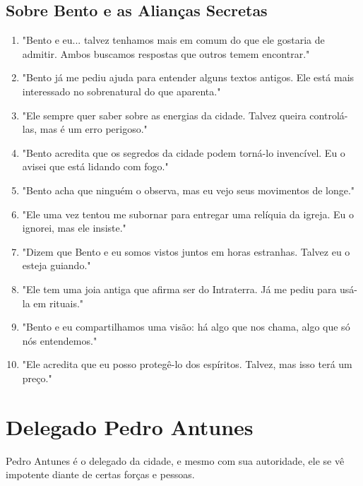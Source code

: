 \subsection*{Sobre Bento e as Alianças Secretas}
\begin{enumerate}
    \item "Bento e eu... talvez tenhamos mais em comum do que ele gostaria de admitir. Ambos buscamos respostas que outros temem encontrar."
    \item "Bento já me pediu ajuda para entender alguns textos antigos. Ele está mais interessado no sobrenatural do que aparenta."
    \item "Ele sempre quer saber sobre as energias da cidade. Talvez queira controlá-las, mas é um erro perigoso."
    \item "Bento acredita que os segredos da cidade podem torná-lo invencível. Eu o avisei que está lidando com fogo."
    \item "Bento acha que ninguém o observa, mas eu vejo seus movimentos de longe."
    \item "Ele uma vez tentou me subornar para entregar uma relíquia da igreja. Eu o ignorei, mas ele insiste."
    \item "Dizem que Bento e eu somos vistos juntos em horas estranhas. Talvez eu o esteja guiando."
    \item "Ele tem uma joia antiga que afirma ser do Intraterra. Já me pediu para usá-la em rituais."
    \item "Bento e eu compartilhamos uma visão: há algo que nos chama, algo que só nós entendemos."
    \item "Ele acredita que eu posso protegê-lo dos espíritos. Talvez, mas isso terá um preço."
\end{enumerate}

\section{Delegado Pedro Antunes}
Pedro Antunes é o delegado da cidade, e mesmo com sua autoridade, ele se vê impotente diante de certas forças e pessoas.

